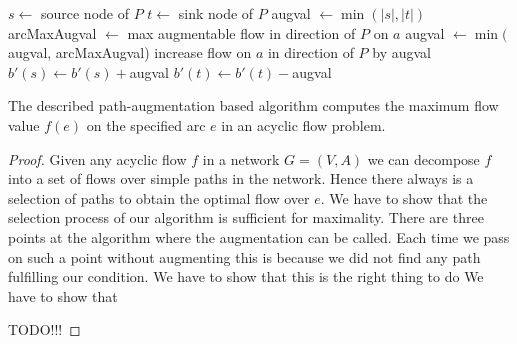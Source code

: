 \begin{algorithm}
 \begin{algorithmic}
    \State $s \gets $ source node of $P$
    \State $t \gets $ sink node of $P$
    \State augval $\gets \min(|s|,|t|)$
      \State arcMaxAugval $\gets$ max augmentable flow in direction of $P$ on $a$ 
      \State augval $\gets \min($augval, arcMaxAugval)
    \EndFor
      \State increase flow on $a$ in direction of $P$ by augval
    \EndFor
    \State $b'(s) \gets b'(s) + $augval
    \State $b'(t) \gets b'(t) - $augval
  \EndFunction
 \end{algorithmic}
 
\end{algorithm}

\begin{prop}
 The described path-augmentation based algorithm computes the maximum flow value $f(e)$ on the specified arc $e$ in an 
acyclic flow problem.
\end{prop}
\begin{proof}
 Given any acyclic flow $f$ in a network $G=(V,A)$ we can decompose $f$ into a set of flows over simple paths in the 
 network. Hence there always is a selection of paths to obtain the optimal flow over $e$. 
 We have to show that the selection process of our algorithm is sufficient for maximality. There are three points at 
 the algorithm where the augmentation can be called. Each time we pass on such a point without augmenting this is 
because we did not find any path fulfilling our condition. We have to show that this is the right thing to do
 We have to show that 
 

 
 TODO!!!
\end{proof}









